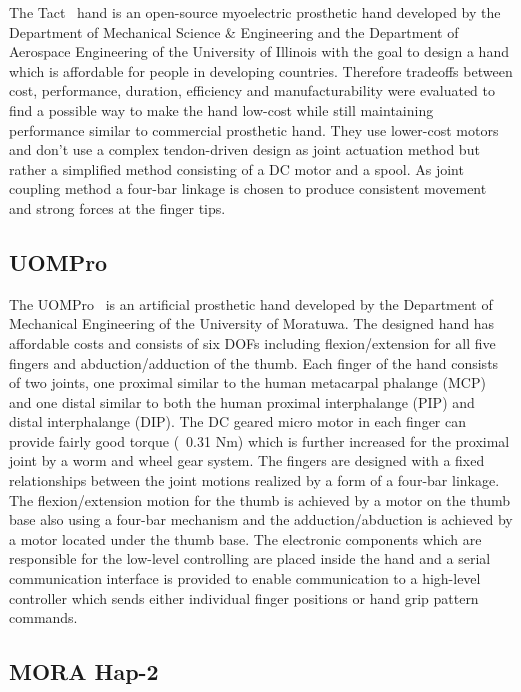 \documentclass[a4paper, 10pt, conference]{ieeeconf}      %
\begin{document}
The Tact~\cite{tact} hand is an open-source myoelectric prosthetic hand developed by the Department of Mechanical Science \& Engineering and the Department of Aerospace Engineering of the University of Illinois with the goal to design a hand which is affordable for people in developing countries. Therefore tradeoffs between cost, performance, duration, efficiency and manufacturability were evaluated to find a possible way to make the hand low-cost while still maintaining performance similar to commercial prosthetic hand. They use lower-cost motors and don't use a complex tendon-driven design as joint actuation method but rather a simplified method consisting of a DC motor and a spool. As joint coupling method a four-bar linkage is chosen to produce consistent movement and strong forces at the finger tips.

\subsection{UOMPro}

The UOMPro~\cite{uompro} is an artificial prosthetic hand developed by the Department of Mechanical Engineering of the University of Moratuwa. The designed hand has affordable costs and consists of six DOFs including flexion/extension for all five fingers and abduction/adduction of the thumb. Each finger of the hand consists of two joints, one proximal similar to the human metacarpal phalange (MCP) and one distal similar to both the human proximal interphalange (PIP) and distal interphalange (DIP). The DC geared micro motor in each finger can provide fairly good torque (~0.31 Nm) which is further increased for the proximal joint by a worm and wheel gear system. The fingers are designed with a fixed relationships between the joint motions realized by a form of a four-bar linkage. The flexion/extension motion for the thumb is achieved by a motor on the thumb base also using a four-bar mechanism and the adduction/abduction is achieved by a motor located under the thumb base. The electronic components which are responsible for the low-level controlling are placed inside the hand and a serial communication interface is provided to enable communication to a high-level controller which sends either individual finger positions or hand grip pattern commands.

\subsection{MORA Hap-2}
\end{document}
